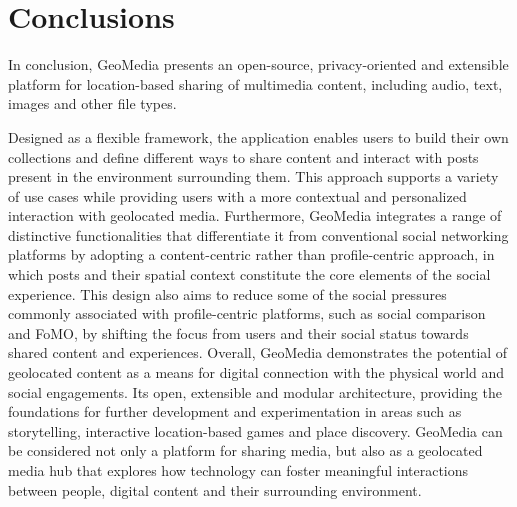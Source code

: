 \chapter{Conclusions}
\label{cap:conclusions}

In conclusion, GeoMedia presents an open-source, privacy-oriented and extensible platform for location-based sharing of multimedia content, including audio, text, images and other file types.

Designed as a flexible framework, the application enables users to build their own collections and define different ways to share content and interact with posts present in the environment surrounding them. This approach supports a variety of use cases while providing users with a more contextual and personalized interaction with geolocated media. 
Furthermore, GeoMedia integrates a range of distinctive functionalities that differentiate it from conventional social networking platforms by adopting a content-centric rather than profile-centric approach, in which posts and their spatial context constitute the core elements of the social experience. This design also aims to reduce some of the social pressures commonly associated with profile-centric platforms, such as social comparison and FoMO, by shifting the focus from users and their social status towards shared content and experiences.
Overall, GeoMedia demonstrates the potential of geolocated content as a means for digital connection with the physical world and social engagements. Its open, extensible and modular architecture, providing the foundations for further development and experimentation in areas such as storytelling, interactive location-based games and place discovery. GeoMedia can be considered not only a platform for sharing media, but also as a geolocated media hub that explores how technology can foster meaningful interactions between people, digital content and their surrounding environment.

